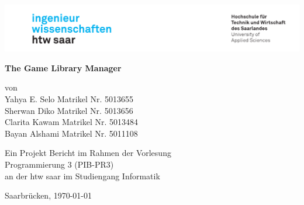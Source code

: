 \begin{titlepage}

    \linespread{1.5}

    \includegraphics[width=\linewidth]{graphics/htw_logo}

    \begin{center}
        \large
        \hfill
        \vfill
        \Large{\bfseries{The Game Library Manager}}

        von \\ Yahya E. Selo Matrikel Nr. 5013655 \\ Sherwan Diko Matrikel Nr. 5013656
        \\ Clarita Kawam Matrikel Nr. 5013484  \\ Bayan Alshami Matrikel Nr. 5011108 

        \vfill

        Ein Projekt Bericht im Rahmen der Vorlesung\\ \glqq Programmierung 3
        (PIB-PR3)\grqq\\ an der htw saar im Studiengang Informatik\\

        \vfill
        \vfill

        Saarbrücken, \today
    \end{center}

\end{titlepage}

